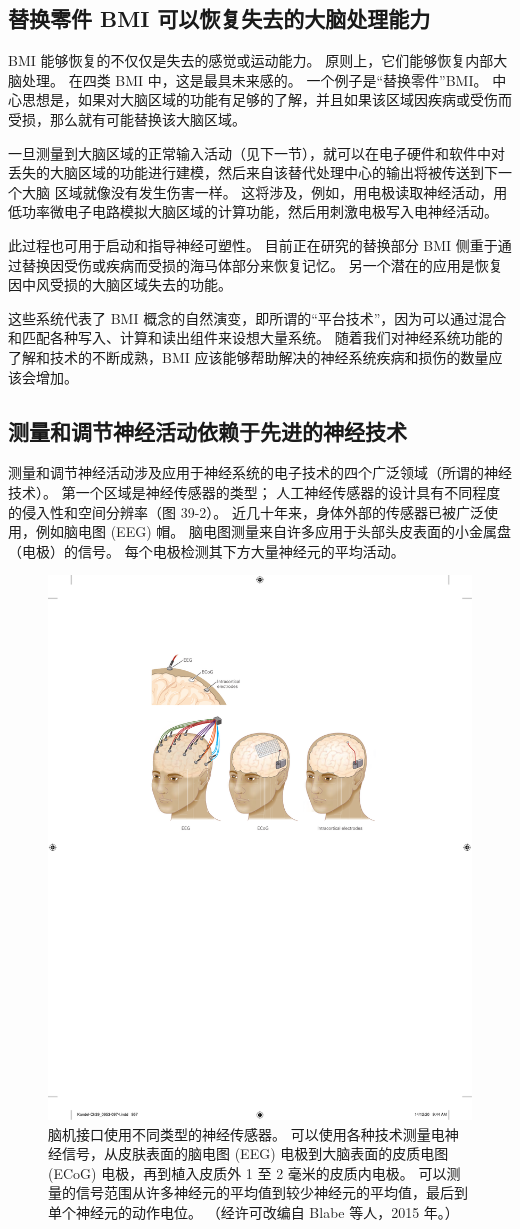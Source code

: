 \subsection{替换零件 BMI 可以恢复失去的大脑处理能力}
BMI 能够恢复的不仅仅是失去的感觉或运动能力。 
原则上，它们能够恢复内部大脑处理。 
在四类 BMI 中，这是最具未来感的。
一个例子是“替换零件”BMI。 
中心思想是，如果对大脑区域的功能有足够的了解，并且如果该区域因疾病或受伤而受损，那么就有可能替换该大脑区域。


一旦测量到大脑区域的正常输入活动（见下一节），就可以在电子硬件和软件中对丢失的大脑区域的功能进行建模，然后来自该替代处理中心的输出将被传送到下一个大脑 区域就像没有发生伤害一样。 
这将涉及，例如，用电极读取神经活动，用低功率微电子电路模拟大脑区域的计算功能，然后用刺激电极写入电神经活动。


此过程也可用于启动和指导神经可塑性。 
目前正在研究的替换部分 BMI 侧重于通过替换因受伤或疾病而受损的海马体部分来恢复记忆。 
另一个潜在的应用是恢复因中风受损的大脑区域失去的功能。


这些系统代表了 BMI 概念的自然演变，即所谓的“平台技术”，因为可以通过混合和匹配各种写入、计算和读出组件来设想大量系统。 
随着我们对神经系统功能的了解和技术的不断成熟，BMI 应该能够帮助解决的神经系统疾病和损伤的数量应该会增加。


\subsection{测量和调节神经活动依赖于先进的神经技术}

测量和调节神经活动涉及应用于神经系统的电子技术的四个广泛领域（所谓的神经技术）。 
第一个区域是神经传感器的类型； 人工神经传感器的设计具有不同程度的侵入性和空间分辨率（图 39-2）。 
近几十年来，身体外部的传感器已被广泛使用，例如脑电图 (EEG) 帽。 脑电图测量来自许多应用于头部头皮表面的小金属盘（电极）的信号。 每个电极检测其下方大量神经元的平均活动。

\begin{figure}[htbp]
	\centering
	\includegraphics[width=0.5\linewidth]{chap39/fig_39_2}
	\caption{脑机接口使用不同类型的神经传感器。 
		可以使用各种技术测量电神经信号，从皮肤表面的脑电图 (EEG) 电极到大脑表面的皮质电图 (ECoG) 电极，再到植入皮质外 1 至 2 毫米的皮质内电极。 
		可以测量的信号范围从许多神经元的平均值到较少神经元的平均值，最后到单个神经元的动作电位。 （经许可改编自 Blabe 等人，2015 年。）}
	\label{fig:39_2}
\end{figure}


